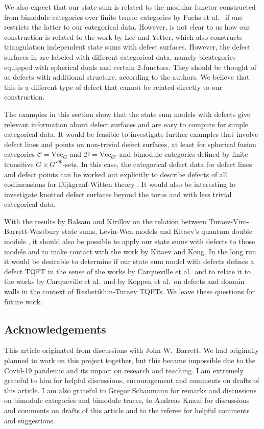 \documentclass[1.5pt, a4paper]{article}
\newcommand{\mac}{\mathcal C}
\newcommand{\mad}{\mathcal D}
\begin{document}
We also expect that our state sum is  related  to the modular functor constructed from bimodule categories over finite tensor categories by Fuchs et al.~\cite{FSS} if one restricts the latter to our categorical data. However,  is not clear to us  how our construction is related to the work \cite{LY} by Lee and Yetter, which also constructs triangulation independent state sums with defect surfaces. However, the defect surfaces in \cite{LY} are labeled with different categorical data, namely  bicategories equipped with spherical duals and certain 2-functors. They  should be thought of as defects with additional structure, according to the authors. We believe that this is a different type of defect that cannot be related directly to our construction.

The examples in this section show that the  state sum models with defects give relevant information about defect surfaces and are easy to compute for simple categorical data. It would be feasible to investigate further examples that involve defect lines and points on non-trivial defect surfaces,  at least for spherical fusion categories $\mac=\mathrm{Vec}_G$ and $\mad=\mathrm{Vec}_{G'}$ and bimodule categories defined by finite transitive $G\times G'^{op}$-sets. In this case, the categorical defect data for defect lines and defect points  can be worked out explicitly to describe defects of all codimensions for Dijkgraaf-Witten theory \cite{DW}. It would also be interesting to investigate knotted defect surfaces beyond the torus and with less trivial categorical data.

With the results by Balsam and Kirillov \cite{BK,Kr}  on the relation between  Turaev-Viro-Barrett-Westbury state sums, Levin-Wen models \cite{LW} and Kitaev's quantum double models \cite{Kit}, it should also be possible to  apply our state sums with defects to those models and to make contact 
with the  work \cite{KK}  by Kitaev and Kong.
In the long run it would be desirable to determine if  our state sum model with defects defines a defect TQFT in the sense of  the works \cite{CMS,CRS2} by Carqueville et al.~and to relate it to the works \cite{CRS,domwall} by Carqueville et al.~and by Koppen et al.~on defects  and domain walls in the context of Reshetikhin-Turaev TQFTs. We leave these questions for future work.


\subsection*{Acknowledgements} 
This article originated from discussions with John W.~Barrett. We had originally planned to work on this project together, but this became impossible due to the Covid-19 pandemic and its impact on  research and teaching. I am extremely grateful to him for helpful discussions, encouragement and comments on drafts of this article. 
I am also  grateful to Gregor Schaumann for  remarks and discussions on bimodule categories and bimodule traces,  to Andreas Knauf for discussions  and  comments on drafts of this article and to the referee for helpful comments and suggestions.
\end{document}
